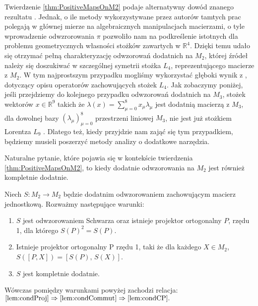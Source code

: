 Twierdzenie \ref{thm:PositiveMapsOnM2} podaje alternatywny dowód
znanego rezultatu \cite{stormer1963positive, woronowicz1976positive}.
Jednak, o ile metody wykorzystywane przez autorów tamtych prac
polegają w głównej mierze na algebraicznych manipulacjach macierzami,
o tyle wprowadzenie odwzrorowania $\pi$ pozwoliło nam
na podkreślenie istotnych dla problemu geometrycznych własności stożków
zawartych w  $\mathbb{R}^{4}$.
Dzięki temu udało się otrzymać pełną charakteryzację odwzorowań dodatnich
na $M_{2}$,
której źródeł należy się doszukiwać w szczególnej symetrii stożka
$L_{4}$, reprezentującego macierze z $M_{2}$.
W tym najprostszym przypadku mogliśmy wykorzystać głęboki wynik z
\cite{loewy1975positive}, dotyczący
opisu operatorów zachowujących stożek $L_{4}$.
Jak zobaczymy poniżej, jeśli przejdziemy do kolejnego przypadku
odwzorowań dodatnich na $M_{3}$,
stożek wektorów $x \in \mathbb{R}^{9}$ takich że
$\lambda(x) =  \sum_{\mu=0}^{8} x_{\mu} \lambda_{\mu}$
jest dodatnią macierzą z $M_{3}$,
dla dowolnej bazy $(\lambda_{\mu})_{\mu=0}^{8}$ przestrzeni liniowej $M_{3}$,
nie jest już stożkiem Lorentza $L_{9}$ \cite{goyal2011geometry}.
Dlatego też, kiedy przyjdzie nam zająć się tym przypadkiem,
będziemy musieli poszerzyć metody analizy o dodatkowe narzędzia.


Naturalne pytanie, które pojawia się w kontekście
twierdzenia \ref{thm:PositiveMapsOnM2},
to kiedy dodatnie odwzorowania na $M_{2}$ jest również kompletnie dodatnie.

\begin{Theorem}
\label{thm:MapsPreservingIdentity}
Niech $S: M_{2} \rightarrow M_{2}$ będzie dodatnim odwzorowaniem zachowującym
macierz jednostkową. Rozważmy następujące warunki:
\begin{enumerate}

\item
\label{lem:condProj}
$S$ jest odwzorowaniem Schwarza oraz istnieje projektor ortogonalny $P$, rzędu 1, dla którego $S(P)^{2} = S(P)$.

\item
\label{lem:condCommut}
Istnieje projektor ortogonalny P rzędu 1, taki że dla każdego $X \in M_{2}$,
$S([P,X]) = [S(P), \, S(X)]$.

\item
\label{lem:condCP}
$S$ jest kompletnie dodatnie.
\end{enumerate}
Wówczas pomiędzy warunkami powyżej zachodzi relacja:
$
\ref{lem:condProj} \Rightarrow
    \ref{lem:condCommut} \Rightarrow \ref{lem:condCP}.
$
\end{Theorem}

